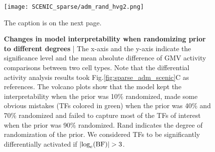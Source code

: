 \newpage

\begin{figure}[H]
    \centering
    \hspace*{-10mm}
    \texttt{[image: SCENIC\_sparse/adm\_rand\_hvg2.png]}
    \caption{\small{The caption is on the next page.}}
    \label{fig:sparse_adm_rand_hvg2}
\end{figure}

\addtocounter{figure}{-1}
\begin{figure}[h!]
    \caption{\small{\textbf{Changes in model interpretability when randomizing prior to different degrees} | The x-axis and the y-axis indicate the significance level and the mean absolute difference of GMV activity comparisons between two cell types. Note that the differential activity analysis results took Fig.\ref{fig:sparse_adm_scenic}C as references. The volcano plots show that the model kept the interpretability when the prior was 10\% randomized, made some obvious mistakes (TFs colored in green) when the prior was 40\% and 70\% randomized and failed to capture most of the TFs of interest when the prior was 90\% randomized. Rand indicates the degree of randomization of the prior. We considered TFs to be significantly differentially activated if $|\textnormal{log}_e(\textnormal{BF})|>3$.}}
\end{figure}

